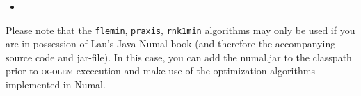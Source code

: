 \documentclass[a4paper,10pt]{scrbook}
\newcommand{\ogo}{\textsc{ogolem}}
\begin{document}
    \begin{itemize}
      \item 
    \end{itemize}


Please note that the \texttt{flemin}, \texttt{praxis}, \texttt{rnk1min} 
algorithms may only be used if you are in possession of Lau's Java Numal 
book\cite{javanumalbook} (and 
therefore the accompanying source code and jar-file). In this case, you can add 
the numal.jar to the classpath prior 
to \ogo{} excecution and make use of the optimization algorithms implemented in 
Numal.


\end{document}
